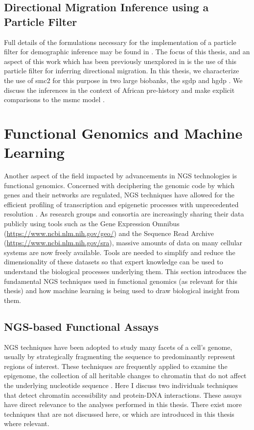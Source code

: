 \subsection{Directional Migration Inference using a Particle Filter}

Full details of the formulations necessary for the implementation of a particle filter for demographic inference may be found in \cite{10.1371/journal.pone.0247647}. The focus of this thesis, and an aspect of this work which has been previously unexplored in \cite{10.1371/journal.pone.0247647} is the use of this particle filter for inferring directional migration. In this thesis, we characterize the use of \gls{smc2} for this purpose in two large biobanks, the \gls{sgdp} and \gls{hgdp} \cite{Mallick2016, Bergstrom2019}. We discuss the inferences in the context of African pre-history and make explicit comparisons to the \gls{msmc} model \cite{Schiffels2014}. 

\section{Functional Genomics and Machine Learning} \label{intro:fungen}

Another aspect of the field impacted by advancements in NGS technologies is functional genomics. Concerned with deciphering the genomic code by which genes and their networks are regulated, NGS techniques have allowed for the efficient profiling of transcription and epigenetic processes with unprecedented resolution \cite{Morozova2008,Cullum2011,Morozova2008a,Hurd2009,T2010}. As research groups and consortia are increasingly sharing their data publicly using tools such as the Gene Expression Omnibus (\url{https://www.ncbi.nlm.nih.gov/geo/}) and the Sequence Read Archive (\url{https://www.ncbi.nlm.nih.gov/sra}), massive amounts of data on many cellular systems are now freely available. Tools are needed to simplify and reduce the dimensionality of these datasets so that expert knowledge can be used to understand the biological processes underlying them. This section introduces the fundamental NGS techniques used in functional genomics (as relevant for this thesis) and how machine learning is being used to draw biological insight from them.

\subsection{NGS-based Functional Assays}

NGS techniques have been adopted to study many facets of a cell's genome, usually by strategically fragmenting the sequence to predominantly represent regions of interest. These techniques are frequently applied to examine the epigenome, the collection of all heritable changes to chromatin that do not affect the underlying nucleotide sequence \cite{Allis2016}.  Here I discuss two individuals techniques that detect chromatin accessibility and protein-DNA interactions.  These assays have direct relevance to the analyses performed in this thesis. There exist more techniques that are not discussed here, or which are introduced in this thesis where relevant. 

